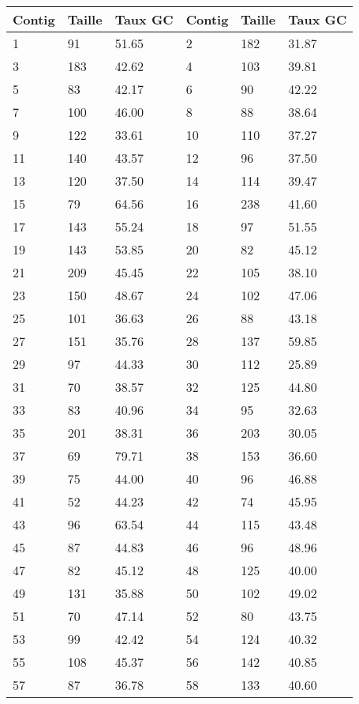 \footnotesize{
\begin{longtable}{|p{3cm}|p{3cm}|p{3cm}|p{3cm}|p{3cm}|p{3cm}|}
\hline
Contig & Taille & Taux GC & Contig & Taille & Taux GC\\
\hline
1 & 91& 51.65 & 2 & 182& 31.87\\
\hline
3 & 183& 42.62 & 4 & 103& 39.81\\
\hline
5 & 83& 42.17 & 6 & 90& 42.22\\
\hline
7 & 100& 46.00 & 8 & 88& 38.64\\
\hline
9 & 122& 33.61 & 10 & 110& 37.27\\
\hline
11 & 140& 43.57 & 12 & 96& 37.50\\
\hline
13 & 120& 37.50 & 14 & 114& 39.47\\
\hline
15 & 79& 64.56 & 16 & 238& 41.60\\
\hline
17 & 143& 55.24 & 18 & 97& 51.55\\
\hline
19 & 143& 53.85 & 20 & 82& 45.12\\
\hline
21 & 209& 45.45 & 22 & 105& 38.10\\
\hline
23 & 150& 48.67 & 24 & 102& 47.06\\
\hline
25 & 101& 36.63 & 26 & 88& 43.18\\
\hline
27 & 151& 35.76 & 28 & 137& 59.85\\
\hline
29 & 97& 44.33 & 30 & 112& 25.89\\
\hline
31 & 70& 38.57 & 32 & 125& 44.80\\
\hline
33 & 83& 40.96 & 34 & 95& 32.63\\
\hline
35 & 201& 38.31 & 36 & 203& 30.05\\
\hline
37 & 69& 79.71 & 38 & 153& 36.60\\
\hline
39 & 75& 44.00 & 40 & 96& 46.88\\
\hline
41 & 52& 44.23 & 42 & 74& 45.95\\
\hline
43 & 96& 63.54 & 44 & 115& 43.48\\
\hline
45 & 87& 44.83 & 46 & 96& 48.96\\
\hline
47 & 82& 45.12 & 48 & 125& 40.00\\
\hline
49 & 131& 35.88 & 50 & 102& 49.02\\
\hline
51 & 70& 47.14 & 52 & 80& 43.75\\
\hline
53 & 99& 42.42 & 54 & 124& 40.32\\
\hline
55 & 108& 45.37 & 56 & 142& 40.85\\
\hline
57 & 87& 36.78 & 58 & 133& 40.60\\
\hline

\end{longtable}}
